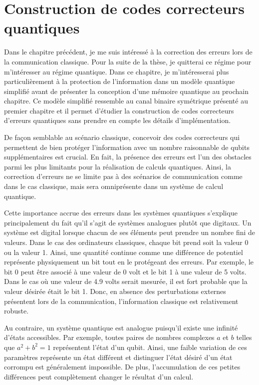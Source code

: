 \begin{comment}
\end{comment}

\chapter{Construction de codes correcteurs quantiques}

Dans le chapitre précédent, 
je me suis intéressé à la correction des erreurs lors de la communication classique.
Pour la suite de la thèse,
je quitterai ce régime pour m'intéresser au régime quantique.
Dans ce chapitre, 
je m'intéresserai plus particulièrement à la protection de l'information 
dans un modèle quantique simplifié avant de présenter la conception d'une mémoire 
quantique au prochain chapitre.
Ce modèle simplifié ressemble au canal binaire symétrique présenté au premier chapitre
et il permet d'étudier la construction de codes correcteurs d'erreurs quantiques sans prendre en compte les détails d'implémentation.

De façon semblable au scénario classique,
concevoir des codes correcteurs qui permettent de bien protéger l'information avec un nombre raisonnable de qubits supplémentaires est crucial.
En fait,
la présence des erreurs est l'un des obstacles parmi les plus
limitants pour la réalisation de calculs quantiques.
Ainsi, 
la correction d'erreurs ne se limite pas à des scénarios de communication 
comme dans le cas classique,
mais sera omniprésente dans un système de calcul quantique.

Cette importance accrue des erreurs dans les systèmes quantiques s'explique
principalement du fait qu'il s'agit de systèmes analogues plutôt que digitaux.
Un système est digital lorsque chacun de ses éléments peut prendre un nombre fini
de valeurs. 
Dans le cas des ordinateurs classiques,
chaque bit prend soit la valeur 0 ou la valeur 1.
Ainsi,
une quantité continue comme une différence de potentiel représente physiquement un bit tout en le protégeant des erreurs.
Par exemple,
le bit 0 peut être associé à une valeur de 0 volt et le bit 1 à une valeur de 5 volts.
Dans le cas où une valeur de 4.9 volts serait mesurée, il est fort probable que 
la valeur désirée était le bit 1.
Donc, en absence des perturbations externes présentent lors de la communication,
l'information classique est relativement robuste.

Au contraire, un système quantique est analogue puisqu'il existe une infinité d'états accessibles.
Par exemple, toutes paires de nombres complexes $a$ et $b$ telles que $a^2 + b^2 = 1$
représentent l'état d'un qubit.
Ainsi, 
une faible variation de ces paramètres représente un état différent
et distinguer l'état désiré d'un état corrompu est généralement impossible.
De plus, l'accumulation de ces petites différences peut complètement
changer le résultat d'un calcul.

